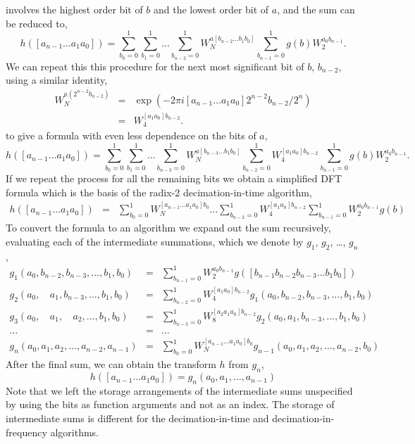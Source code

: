 \documentclass[fleqn,12pt]{article}
\begin{document}
involves the highest order bit of $b$ and the lowest order bit of $a$,
and the sum can be reduced to,
%
\begin{equation}
h([a_{n-1} \dots a_1 a_0])
= 
\sum_{b_0=0}^{1} 
\sum_{b_1=0}^{1} 
\dots
\sum_{b_{n-2}=0}^{1} 
W_N^{a[b_{n-2} \dots b_1 b_0]}
\sum_{b_{n-1}=0}^{1} 
 g(b) 
W_2^{a_0 b_{n-1}}.
\end{equation}
%
We can repeat this this procedure for the next most significant bit of
$b$, $b_{n-2}$, using a similar identity,
%
\begin{eqnarray}
W_N^{a(2^{n-2}b_{n-2})} 
&=& \exp(-2\pi i [a_{n-1} \dots a_1 a_0] 2^{n-2} b_{n-2}/ 2^n )\\
&=& W_4^{ [a_1 a_0] b_{n-2}}.
\end{eqnarray}
%
to give a formula with even less dependence on the bits of $a$, 
%
\begin{equation}
h([a_{n-1} \dots a_1 a_0])
= 
\sum_{b_0=0}^{1} 
\sum_{b_1=0}^{1} 
\dots
\sum_{b_{n-3}=0}^{1} 
W_N^{a[b_{n-3} \dots b_1 b_0]}
\sum_{b_{n-2}=0}^{1} 
W_4^{[a_1 a_0] b_{n-2}}
\sum_{b_{n-1}=0}^{1} 
 g(b) 
W_2^{a_0 b_{n-1}}.
\end{equation}
%
If we repeat the process for all the remaining bits we obtain a
simplified DFT formula which is the basis of the radix-2
decimation-in-time algorithm,
%
\begin{eqnarray}
h([a_{n-1} \dots a_1 a_0]) &=& 
\sum_{b_0=0}^{1} 
W_{N}^{[a_{n-1} \dots a_1 a_0]b_0} 
\dots
\sum_{b_{n-2}=0}^{1} 
W_4^{ [a_1 a_0] b_{n-2}}
\sum_{b_{n-1}=0}^{1} 
W_2^{a_0 b_{n-1}}
g(b)
\end{eqnarray}
%
To convert the formula to an algorithm we expand out the sum
recursively, evaluating each of the intermediate summations, which we
denote by $g_1$, $g_2$, \dots, $g_n$,
%
\begin{eqnarray}
g_1(a_0,  b_{n-2}, b_{n-3}, \dots, b_1, b_0) 
&=& 
\sum_{b_{n-1}=0}^{1} 
W_2^{a_0 b_{n-1}}
g([b_{n-1}  b_{n-2}  b_{n-3}  \dots  b_1  b_0]) \\
g_2(a_0, {}_{\phantom{-2}} a_{1}, b_{n-3}, \dots, b_1, b_0) 
&=& 
\sum_{b_{n-2}=0}^{1} 
W_4^{[a_1 a_0] b_{n-2}}
g_1(a_0, b_{n-2}, b_{n-3}, \dots, b_1, b_0) \\
g_3(a_0, {}_{\phantom{-2}} a_{1}, {}_{\phantom{-3}} a_{2}, \dots, b_1, b_0) 
&=& 
\sum_{b_{n-3}=0}^{1} 
W_8^{[a_2 a_1 a_0] b_{n-2}}
g_2(a_0, a_1, b_{n-3}, \dots, b_1, b_0) \\
\dots &=& \dots \\
g_n(a_0, a_{1}, a_{2}, \dots, a_{n-2}, a_{n-1}) 
&=&
\sum_{b_{0}=0}^{1} 
W_N^{[a_{n-1} \dots a_1 a_0]b_0}
g_{n-1}(a_0, a_1, a_2, \dots, a_{n-2}, b_0) 
\end{eqnarray}
%
After the final sum, we can obtain the transform $h$ from $g_n$,
%
\begin{equation}
h([a_{n-1} \dots a_1 a_0]) 
= 
g_n(a_0, a_1, \dots, a_{n-1}) 
\end{equation}
% 
Note that we left the storage arrangements of the intermediate sums
unspecified by using the bits as function arguments and not as an
index. The storage of intermediate sums is different for the
decimation-in-time and decimation-in-frequency algorithms.
\end{document}
